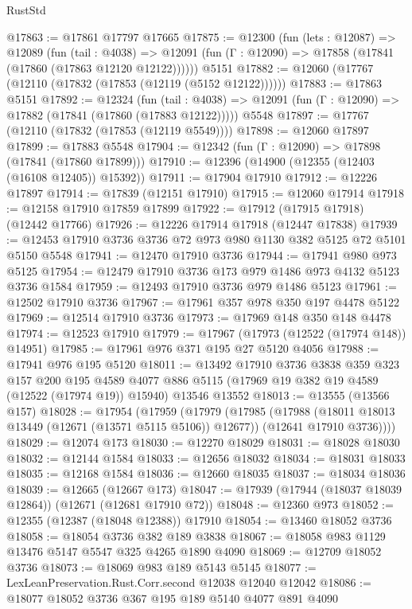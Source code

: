 \begin{lexlean}{RustStd}
\begin{coremodule}
@17863 := @17861 @17797 @17665
@17875 := @12300
    (fun (lets : @12087) =>
    @12089
      (fun (tail : @4038) =>
      @12091 (fun (Γ : @12090) => @17858 (@17841 (@17860 (@17863 @12120 @12122))))))
    @5151
@17882 := @12060 (@17767 (@12110 (@17832 (@17853 (@12119 (@5152 @12122))))))
@17883 := @17863 @5151
@17892 := @12324
    (fun (tail : @4038) => @12091 (fun (Γ : @12090) => @17882 (@17841 (@17860 (@17883 @12122)))))
    @5548
@17897 := @17767 (@12110 (@17832 (@17853 (@12119 @5549))))
@17898 := @12060 @17897
@17899 := @17883 @5548
@17904 := @12342 (fun (Γ : @12090) => @17898 (@17841 (@17860 @17899)))
@17910 := @12396 (@14900 (@12355 (@12403 (@16108 @12405)) @15392))
@17911 := @17904 @17910
@17912 := @12226 @17897
@17914 := @17839 (@12151 @17910)
@17915 := @12060 @17914
@17918 := @12158 @17910 @17859 @17899
@17922 := @17912 (@17915 @17918) (@12442 @17766)
@17926 := @12226 @17914 @17918 (@12447 @17838)
@17939 := @12453 @17910 @3736 @3736 @72 @973 @980 @1130 @382 @5125 @72 @5101 @5150 @5548
@17941 := @12470 @17910 @3736
@17944 := @17941 @980 @973 @5125
@17954 := @12479 @17910 @3736 @173 @979 @1486 @973 @4132 @5123 @3736 @1584
@17959 := @12493 @17910 @3736 @979 @1486 @5123
@17961 := @12502 @17910 @3736
@17967 := @17961 @357 @978 @350 @197 @4478 @5122
@17969 := @12514 @17910 @3736
@17973 := @17969 @148 @350 @148 @4478
@17974 := @12523 @17910
@17979 := @17967 (@17973 (@12522 (@17974 @148)) @14951)
@17985 := @17961 @976 @371 @195 @27 @5120 @4056
@17988 := @17941 @976 @195 @5120
@18011 := @13492
    @17910
    @3736
    @3838
    @359
    @323
    @157
    @200
    @195
    @4589
    @4077
    @886
    @5115
    (@17969 @19 @382 @19 @4589 (@12522 (@17974 @19)) @15940)
    @13546
    @13552
@18013 := @13555 (@13566 @157)
@18028 := @17954
    (@17959
      (@17979
        (@17985
          (@17988 (@18011 @18013 @13449 (@12671 (@13571 @5115 @5106)) @12677))
          (@12641 @17910 @3736))))
@18029 := @12074 @173
@18030 := @12270 @18029
@18031 := @18028 @18030
@18032 := @12144 @1584
@18033 := @12656 @18032
@18034 := @18031 @18033
@18035 := @12168 @1584
@18036 := @12660 @18035
@18037 := @18034 @18036
@18039 := @12665 (@12667 @173)
@18047 := @17939 (@17944 (@18037 @18039 @12864)) (@12671 (@12681 @17910 @72))
@18048 := @12360 @973
@18052 := @12355 (@12387 (@18048 @12388)) @17910
@18054 := @13460 @18052 @3736
@18058 := @18054 @3736 @382 @189 @3838
@18067 := @18058 @983 @1129 @13476 @5147 @5547 @325 @4265 @1890 @4090
@18069 := @12709 @18052 @3736
@18073 := @18069 @983 @189 @5143 @5145
@18077 := LexLeanPreservation.Rust.Corr.second @12038 @12040 @12042
@18086 := @18077 @18052 @3736 @367 @195 @189 @5140 @4077 @891 @4090

\end{coremodule}
\end{lexlean}
